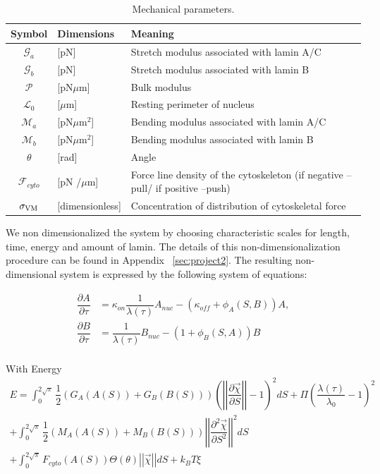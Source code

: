 \begin{table}[t!]
\caption{Mechanical parameters.}\centering \label{tab:nucmodelparameters} 
\begin{tabular}{ c  l  l}
\hline
Symbol & Dimensions & Meaning \\
\hline
$\mathcal{G}_a $ & [pN]  & Stretch modulus associated with lamin A/C \\
$\mathcal{G}_b$& [pN] & Stretch modulus associated with lamin B\\
$\mathcal{P}$ & [pN$\mu$m] & Bulk modulus \\
$\mathcal{L}_0$  & [$\mu$m] & Resting perimeter of nucleus\\
$\mathcal{M}_a$ & [pN$\mu$m$^2$] &  Bending modulus associated with lamin A/C\\
$\mathcal{M}_b $ & [pN$\mu$m$^2$] &  Bending modulus associated with lamin B\\
$\theta$ &  [rad] & Angle \\
$\mathcal{F}_{cyto}$ & [pN /$\mu$m] & Force line density of the cytoskeleton (if negative --pull/ if positive --push)\\
$\sigma_{\rm VM}$ & [dimensionless] & Concentration of distribution of cytoskeletal force\\
\hline
\end{tabular}
\end{table}


We non dimensionalized the system by choosing characteristic scales for length, time, energy and amount of lamin. The details of this non-dimensionalization procedure can be found in Appendix ~\ref{sec:project2}. The resulting non-dimensional system is expressed by the following system of equations:

\begin{align}
\dfrac{\partial A}{\partial \tau} &= \kappa_{on}\dfrac{1}{\lambda (\tau)} A_{nuc}  - (\kappa_{off}+ \phi_A (S,B)) A,  \\[10pt]
\dfrac{\partial B}{\partial \tau} &= \dfrac{1}{\lambda (\tau)} B_{nuc}  - (1+ \phi_B (S,A)) B  \\[10pt]
\end{align}

With Energy 
\begin{align}
 E = \displaystyle \int_0^{2 \sqrt{\pi}} \dfrac{1}{2} (G_A(A(S))+ G_B(B(S)))\left( \left |\left|  \dfrac{\partial \vec{\chi} }{\partial S} \right|\right| - 1\right)^2  dS + \Pi \left(\dfrac{\lambda(\tau)}{\lambda_0} -1\right)^2\\[10pt]
 +\displaystyle\int_0^{2\sqrt{\pi}} \dfrac{1}{2 } (M_A(A(S))+ M_B(B(S)))\left|\left| \dfrac{\partial^2 \vec{\chi}}{\partial S^2} \right|\right|^2 dS\\[10pt]
+ \displaystyle\int_0^{2\sqrt{\pi}} F_{cyto}(A(S))\Theta (\theta) \left|\left| \vec{\chi} \right|\right| dS +k_BT \xi
\end{align}

